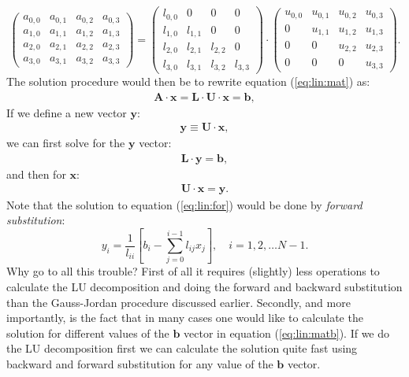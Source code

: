 \documentclass[graybox,sectrefs,envcountresetchap,open=right,final]{svmonodo}
\begin{document}
\begin{equation}
\begin{pmatrix}
a_{0,0}&a_{0,1}&a_{0,2}&a_{0,3}\\ 
a_{1,0}&a_{1,1}&a_{1,2}&a_{1,3}\\ 
a_{2,0}&a_{2,1}&a_{2,2}&a_{2,3}\\ 
a_{3,0}&a_{3,1}&a_{3,2}&a_{3,3}
\end{pmatrix}
=
\begin{pmatrix}
l_{0,0}&0&0&0\\ 
l_{1,0}&l_{1,1}&0&0\\ 
l_{2,0}&l_{2,1}&l_{2,2}&0\\ 
l_{3,0}&l_{3,1}&l_{3,2}&l_{3,3}
\end{pmatrix}
\cdot
\begin{pmatrix}
u_{0,0}&u_{0,1}&u_{0,2}&u_{0,3}\\ 
0&u_{1,1}&u_{1,2}&u_{1,3}\\ 
0&0&u_{2,2}&u_{2,3}\\ 
0&0&0&u_{3,3}
\end{pmatrix}.
\end{equation}
The solution procedure would then be to rewrite equation (\ref{eq:lin:mat}) as:
\begin{align}
\mathbf{A\cdot x}=\mathbf{L}\cdot\mathbf{U}\cdot\mathbf{x}=\mathbf{b},\label{eq:lin:matb}
\end{align}
If we define a new vector $\mathbf{y}$:
\begin{align}
\mathbf{y}\equiv\mathbf{U}\cdot\mathbf{x},
\end{align}
we can first solve for the $\mathbf{y}$ vector:
\begin{align}
\mathbf{L}\cdot\mathbf{y}=\mathbf{b},\label{eq:lin:for}
\end{align}
and then for $\mathbf{x}$:
\begin{align}
\mathbf{U}\cdot\mathbf{x}=\mathbf{y}.
\end{align}
Note that the solution to equation (\ref{eq:lin:for}) would be done by \emph{forward substitution}:
\begin{equation}
y_i=\frac{1}{l_{ii}}\left[b_i-\sum_{j=0}^{i-1}l_{ij}x_j\right],\quad i=1,2,\ldots N-1.
\label{eq:lin:back3}
\end{equation}
Why go to all this trouble? First of all it requires (slightly) less operations to calculate the LU decomposition and doing the forward and backward substitution than the Gauss-Jordan procedure discussed earlier. Secondly, and more importantly, is the fact that in many cases one would like to calculate the solution for different values of the $\mathbf{b}$ vector in equation (\ref{eq:lin:matb}). If we do the LU decomposition first we can calculate the solution quite fast using backward and forward substitution for any value of the $\mathbf{b}$ vector.
\end{document}
